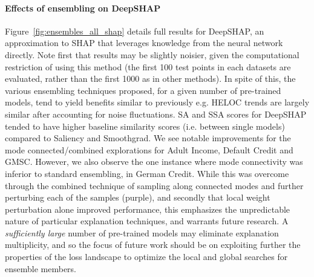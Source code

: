 \paragraph{Effects of ensembling on DeepSHAP} Figure~\ref{fig:ensembles_all_shap} details full results for DeepSHAP, an approximation to SHAP that leverages knowledge from the neural network directly. Note first that results may be slightly noisier, given the computational restriction of using this method (the first 100 test points in each datasets are evaluated, rather than the first 1000 as in other methods). In spite of this, the various ensembling techniques proposed, for a given number of pre-trained models, tend to yield benefits similar to previously e.g. HELOC trends are largely similar after accounting for noise fluctuations. SA and SSA scores for DeepSHAP tended to have higher baseline similarity scores (i.e. between single models) compared to Saliency and Smoothgrad. We see notable improvements for the mode connected/combined explorations for Adult Income, Default Credit and GMSC. However, we also observe the one instance where mode connectivity was inferior to standard ensembling, in German Credit. While this was overcome through the combined technique of sampling along connected modes and further perturbing each of the samples (purple), and secondly that local weight perturbation alone improved performance, this emphasizes the unpredictable nature of particular explanation techniques, and warrants future research. A \textit{sufficiently large} number of pre-trained models may eliminate explanation multiplicity, and so the focus of future work should be on exploiting further the properties of the loss landscape to optimize the local and global searches for ensemble members.

